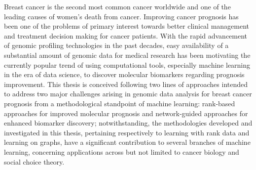 Breast cancer is the second most common cancer worldwide and one of the leading causes of women's death from cancer. Improving cancer prognosis has been one of the problems of primary interest towards better clinical management and treatment decision making for cancer patients. With the rapid advancement of genomic profiling technologies in the past decades, easy availability of a substantial amount of genomic data for medical research has been motivating the currently popular trend of using computational tools, especially machine learning in the era of data science, to discover molecular biomarkers regarding prognosis improvement. This thesis is conceived following two lines of approaches intended to address two major challenges arising in genomic data analysis for breast cancer prognosis from a methodological standpoint of machine learning: rank-based approaches for improved molecular prognosis and network-guided approaches for enhanced biomarker discovery; notwithstanding, the methodologies developed and investigated in this thesis, pertaining respectively to learning with rank data and learning on graphs, have a significant contribution to several branches of machine learning, concerning applications across but not limited to cancer biology and social choice theory.